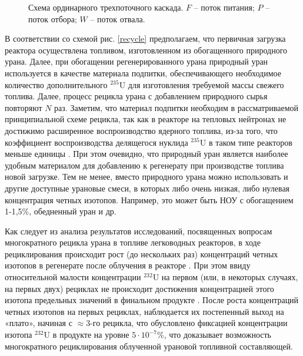 \begin{figure}[ht]
  \caption{Схема ординарного трехпоточного каскада. $F$ -- поток питания; $P$ -- поток отбора; $W$ -- поток отвала.}\label{ordinary}
\end{figure}

В соответствии со схемой рис. \ref{recycle} предполагаем, что первичная загрузка реактора осуществлена топливом, изготовленном из обогащенного природного урана. Далее, при обогащении регенерированного урана природный уран используется в качестве материала подпитки, обеспечивающего необходимое количество дополнительного $^{235}$U для изготовления требуемой массы свежего топлива. Далее, процесс рецикла урана с добавлением природного сырья повторяют $N$ раз. Заметим, что материал подпитки необходим в рассматриваемой принципиальной схеме рецикла, так как в реакторе на тепловых нейтронах не достижимо расширенное воспроизводство ядерного топлива, из-за того, что коэффициент воспроизводства делящегося нуклида $^{235}$U в таком типе реакторов меньше единицы \cite{ignatevVliyanieVidaTopliva2020}. При этом очевидно, что природный уран является наиболее удобным материалом для добавлению к регенерату при производстве топлива новой загрузке. Тем не менее, вместо природного урана можно использовать и другие доступные урановые смеси, в которых либо очень низкая, либо нулевая концентрация четных изотопов. Например, это может быть НОУ с обогащением 1-1,5\%, обедненный уран и др.


Как следует из анализа результатов исследований, посвященных вопросам многократного рецикла урана в топливе легководных реакторов, в ходе рециклирования происходит рост (до нескольких раз) концентраций четных изотопов в регенерате после облучения в реакторе \cite{smirnovEvolutionIsotopicComposition2012}. При этом ввиду относительной малости концентрации $^{232}$U на первом (или, в некоторых случаях, на первых двух) рециклах не происходит достижения концентрацией этого изотопа предельных значений в финальном продукте \cite{smirnovApplyingEnrichmentCapacities2018}.
После роста концентраций четных изотопов на первых рециклах, наблюдается их постепенный выход на «плато», начиная с $\approx$3-го рецикла, что обусловлено фиксацией концентрации изотопа $^{232}$U в продукте на уровне $5\cdot10^{-7}$\%, что доказывает возможность многократного рециклирования облученной урановой топливной составляющей.

